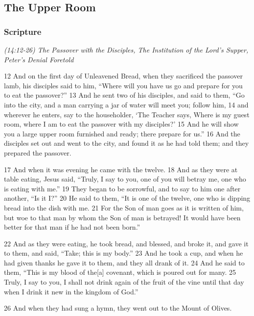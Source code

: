 \documentclass[letterpaper]{report}
\begin{document}
\clearpage
\subsection{The Upper Room}
\begin{multicols}{2}
	\mbox{}
\end{multicols}
\subsubsection{Scripture}

{\centering
	\emph{(14:12-26) The Passover with the Disciples,
		The Institution of the Lord’s Supper,
		Peter’s Denial Foretold}\\
}
\begin{multicols}{2}
12 And on the first day of Unleavened Bread, when they sacrificed the passover lamb, his disciples said to him, “Where will you have us go and prepare for you to eat the passover?” 13 And he sent two of his disciples, and said to them, “Go into the city, and a man carrying a jar of water will meet you; follow him, 14 and wherever he enters, say to the householder, ‘The Teacher says, Where is my guest room, where I am to eat the passover with my disciples?’ 15 And he will show you a large upper room furnished and ready; there prepare for us.” 16 And the disciples set out and went to the city, and found it as he had told them; and they prepared the passover.

17 And when it was evening he came with the twelve. 18 And as they were at table eating, Jesus said, “Truly, I say to you, one of you will betray me, one who is eating with me.” 19 They began to be sorrowful, and to say to him one after another, “Is it I?” 20 He said to them, “It is one of the twelve, one who is dipping bread into the dish with me. 21 For the Son of man goes as it is written of him, but woe to that man by whom the Son of man is betrayed! It would have been better for that man if he had not been born.”

22 And as they were eating, he took bread, and blessed, and broke it, and gave it to them, and said, “Take; this is my body.” 23 And he took a cup, and when he had given thanks he gave it to them, and they all drank of it. 24 And he said to them, “This is my blood of the[a] covenant, which is poured out for many. 25 Truly, I say to you, I shall not drink again of the fruit of the vine until that day when I drink it new in the kingdom of God.”

26 And when they had sung a hymn, they went out to the Mount of Olives.
\end{multicols}
\end{document}
